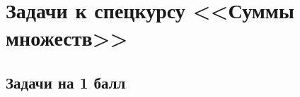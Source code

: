 
\section*{Задачи к спецкурсу <<Суммы множеств>>}


\begingroup %
\newcommand\abs[1]{\lvert #1 \rvert}
\newcommand\bigabs[1]{\bigl\lvert #1 \bigr\rvert}
\newcommand\Abs[1]{\left\lvert #1 \right\rvert}

\subsection*{Задачи на 1 балл}

